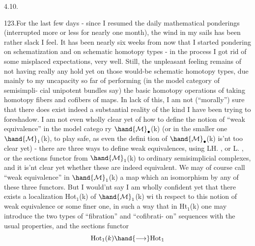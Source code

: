 
4.10.

123.\quad For the last few days  - since I resumed the daily mathematical
ponderings (interrupted more or less for nearly one month),  the wind in
my sails has been rather slack I feel.  It has been nearly six weeks
from now that I started pondering on schematization and on schematic
homotopy types - in the process I got rid of some misplaced expectations,
very well.  Still,  the unpleasant feeling remains of not having really
any hold yet on those would-be schematic homotopy types,  due mainly to
my uncapacity so far of performing (in the model category of semisimpli-%
cial unipotent bundles say) the basic homotopy operations of taking
homotopy fibers and cofibers of maps.  In lack of this,  I am not 
(``morally'') sure that there does exist indeed a substantial  reality
of the kind I have been trying to foreshadow.  I am not even wholly clear
yet of how to define the notion of ``weak equivalence'' in the model catego%
ry $\hand{\mathcal{M}}_\bullet$(k) (or in the smaller one $\hand{\mathcal{M}}_1$(k), to play safe, as even the defini%
tion of $\hand{\mathcal{M}}_\bullet$(k) is'nt too clear yet) -  there are three ways to define
weak equivalences,  using LH. , or L\hand{$\pi$}. , or the sections functor
from $\hand{\mathcal{M}}_1$(k) to ordinary semisimplicial complexes,  and it is'nt clear
yet whether these are indeed equivalent.  We may of course call ``weak
equivalence'' in $\hand{\mathcal{M}}_1$(k)  a map which  an isomorphism by
any of these three functors.  But I would'nt say I am wholly confident
yet that there exists  a localization Hot$_1$(k) of $\hand{\mathcal{M}}_1$(k)\hand{,} wi th respect
to this notion of weak equivalence or some finer one,  in such a way that
in Ht$_1$(k) one may introduce the two types of ``fibration'' and ``cofibrati-%
on'' sequences with the usual properties,  and the sections functor
\[ \mathrm{Hot}_1(k) \hand{\longrightarrow} \mathrm{Hot}_1 \]
